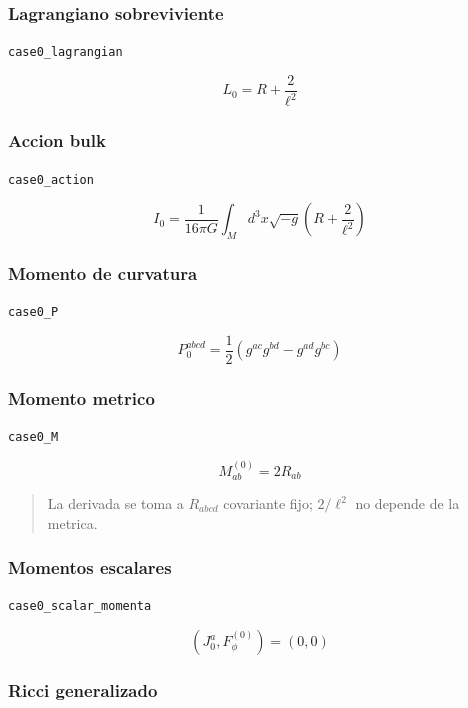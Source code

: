 \documentclass[11pt,a4paper]{article}
\begin{document}
\subsubsection{Lagrangiano sobreviviente}

\noindent\texttt{case0\_lagrangian}\par\nopagebreak[4]

\[
L_0 = R+\frac{2}{\ell^2}
\]

\subsubsection{Accion bulk}

\noindent\texttt{case0\_action}\par\nopagebreak[4]

\[
I_0 = \frac{1}{16\pi G}\int_M d^3x\sqrt{-g}\left(R+\frac{2}{\ell^2}\right)
\]

\subsubsection{Momento de curvatura}

\noindent\texttt{case0\_P}\par\nopagebreak[4]

\[
P_0^{abcd} = \frac12\left(g^{ac}g^{bd}-g^{ad}g^{bc}\right)
\]

\subsubsection{Momento metrico}

\noindent\texttt{case0\_M}\par\nopagebreak[4]

\[
M^{(0)}_{ab} = 2R_{ab}
\]

\begin{quote}\small La derivada se toma a \(R_{abcd}\) covariante fijo; \(2/\ell^2\) no depende de la metrica.\end{quote}

\subsubsection{Momentos escalares}

\noindent\texttt{case0\_scalar\_momenta}\par\nopagebreak[4]

\[
(J_0^a,F_\phi^{(0)}) = (0,0)
\]

\subsubsection{Ricci generalizado}
\end{document}
